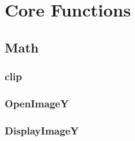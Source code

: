 \section{Core Functions}
\subsection{Math} 

\subsubsection{clip} 
\subsubsection{OpenImageY}
\subsubsection{DisplayImageY}

